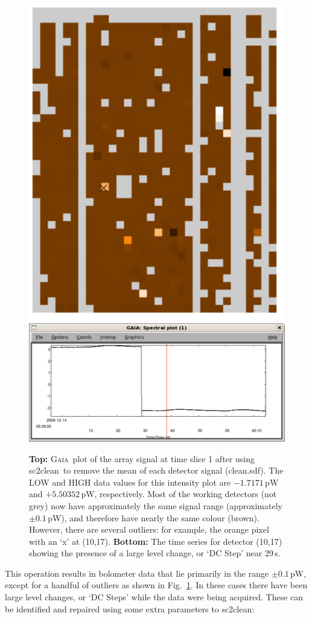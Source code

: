 \documentclass[twoside,11pt]{article}
\newcommand{\gaia}{\xref{\textsc{Gaia}}{sun214}{}}
\newcommand{\task}[1]{\textsf{#1}}
\newcommand{\clean}{\xref{\task{sc2clean}}{sun258}{SC2CLEAN}}
\newcommand{\xref}[3]{#1}
\renewcommand{\_}{\texttt{\symbol{95}}}
\begin{document}
\begin{figure}
\begin{center}
\includegraphics[width=0.5\linewidth]{sc19_array_mean}
\includegraphics[width=0.9\linewidth]{sc19_dcstep}
\caption{{\bf Top:} \gaia\ plot of the array signal at time slice 1
  after using \clean\ to remove the mean of each detector signal
  (clean.sdf). The LOW and HIGH data values for this intensity plot
  are $-1.7171$\,pW and $+5.50352$\,pW, respectively. Most of the
  working detectors (not grey) now have approximately the same signal
  range (approximately $\pm 0.1$\,pW), and therefore have nearly the
  same colour (brown). However, there are several outliers: for
  example, the orange pixel with an `x' at (10,17). {\bf Bottom:} The
  time series for detector (10,17) showing the presence of a large
  level change, or `DC Step' near 29\,s.}
\label{fig:array_mean}
\end{center}
\end{figure}

This operation results in bolometer data that lie primarily in the
range $\pm 0.1$\,pW, except for a handful of outliers as shown in
Fig.~\ref{fig:array_mean}. In these cases there have been large level
changes, or `DC Steps' while the data were being acquired. These can
be identified and repaired using some extra parameters to \clean:
\end{document}
